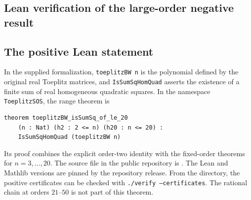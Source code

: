\subsection{Lean verification of the large-order negative result}
\label{app:lean-negative}


\subsection{The positive Lean statement}\label{app:positive-lean}

In the supplied formalization, \texttt{toeplitzBW n} is the
polynomial defined by the original real Toeplitz matrices, and
\texttt{IsSumSqHomQuad} asserts the existence of a finite sum of
real homogeneous quadratic squares. In the namespace
\texttt{ToeplitzSOS}, the range theorem is
\begin{lstlisting}[basicstyle=\ttfamily\small,breaklines=true]
theorem toeplitzBW_isSumSq_of_le_20
    (n : Nat) (h2 : 2 <= n) (h20 : n <= 20) :
    IsSumSqHomQuad (toeplitzBW n)
\end{lstlisting}
Its proof combines the explicit order-two identity with the
fixed-order theorems for $n=3,\ldots,20$.
The source file in the public repository is
.
The Lean and Mathlib versions are pinned by the repository release.
From the  directory, the positive certificates can be
checked with \texttt{./verify --certificates}.  The rational chain at
orders $21$--$50$ is not part of this theorem.
